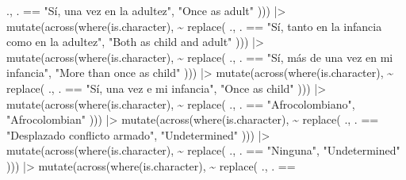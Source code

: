 \documentclass[
  bookmarksnumbered]{article}
\newenvironment{Shaded}{\begin{snugshade}}{\end{snugshade}}
\newcommand{\FunctionTok}[1]{\textcolor[rgb]{0.94,0.94,0.56}{#1}}
\newcommand{\NormalTok}[1]{\textcolor[rgb]{0.80,0.80,0.80}{#1}}
\newcommand{\SpecialCharTok}[1]{\textcolor[rgb]{0.86,0.64,0.64}{#1}}
\newcommand{\StringTok}[1]{\textcolor[rgb]{0.80,0.58,0.58}{#1}}
\begin{document}
\begin{Shaded}
\begin{Highlighting}[]
\NormalTok{    ., . }\SpecialCharTok{==}
      \StringTok{"Sí, una vez en la adultez"}\NormalTok{,}
    \StringTok{"Once as adult"}
\NormalTok{  ))) }\SpecialCharTok{|\textgreater{}}
  \FunctionTok{mutate}\NormalTok{(}\FunctionTok{across}\NormalTok{(}\FunctionTok{where}\NormalTok{(is.character), }\SpecialCharTok{\textasciitilde{}} \FunctionTok{replace}\NormalTok{(}
\NormalTok{    ., . }\SpecialCharTok{==}
      \StringTok{"Sí, tanto en la infancia como en la adultez"}\NormalTok{,}
    \StringTok{"Both as child and adult"}
\NormalTok{  ))) }\SpecialCharTok{|\textgreater{}}
  \FunctionTok{mutate}\NormalTok{(}\FunctionTok{across}\NormalTok{(}\FunctionTok{where}\NormalTok{(is.character), }\SpecialCharTok{\textasciitilde{}} \FunctionTok{replace}\NormalTok{(}
\NormalTok{    ., . }\SpecialCharTok{==}
      \StringTok{"Sí, más de una vez en mi infancia"}\NormalTok{,}
    \StringTok{"More than once as child"}
\NormalTok{  ))) }\SpecialCharTok{|\textgreater{}}
  \FunctionTok{mutate}\NormalTok{(}\FunctionTok{across}\NormalTok{(}\FunctionTok{where}\NormalTok{(is.character), }\SpecialCharTok{\textasciitilde{}} \FunctionTok{replace}\NormalTok{(}
\NormalTok{    ., . }\SpecialCharTok{==}
      \StringTok{"Sí, una vez e mi infancia"}\NormalTok{,}
    \StringTok{"Once as child"}
\NormalTok{  ))) }\SpecialCharTok{|\textgreater{}}
  \FunctionTok{mutate}\NormalTok{(}\FunctionTok{across}\NormalTok{(}\FunctionTok{where}\NormalTok{(is.character), }\SpecialCharTok{\textasciitilde{}} \FunctionTok{replace}\NormalTok{(}
\NormalTok{    ., . }\SpecialCharTok{==}
      \StringTok{"Afrocolombiano"}\NormalTok{,}
    \StringTok{"Afrocolombian"}
\NormalTok{  ))) }\SpecialCharTok{|\textgreater{}}
  \FunctionTok{mutate}\NormalTok{(}\FunctionTok{across}\NormalTok{(}\FunctionTok{where}\NormalTok{(is.character), }\SpecialCharTok{\textasciitilde{}} \FunctionTok{replace}\NormalTok{(}
\NormalTok{    ., . }\SpecialCharTok{==}
      \StringTok{"Desplazado conflicto armado"}\NormalTok{,}
    \StringTok{"Undetermined"}
\NormalTok{  ))) }\SpecialCharTok{|\textgreater{}}
  \FunctionTok{mutate}\NormalTok{(}\FunctionTok{across}\NormalTok{(}\FunctionTok{where}\NormalTok{(is.character), }\SpecialCharTok{\textasciitilde{}} \FunctionTok{replace}\NormalTok{(}
\NormalTok{    ., . }\SpecialCharTok{==}
      \StringTok{"Ninguna"}\NormalTok{,}
    \StringTok{"Undetermined"}
\NormalTok{  ))) }\SpecialCharTok{|\textgreater{}}
  \FunctionTok{mutate}\NormalTok{(}\FunctionTok{across}\NormalTok{(}\FunctionTok{where}\NormalTok{(is.character), }\SpecialCharTok{\textasciitilde{}} \FunctionTok{replace}\NormalTok{(}
\NormalTok{    ., . }\SpecialCharTok{==}

\end{Highlighting}
\end{Shaded}
\end{document}
